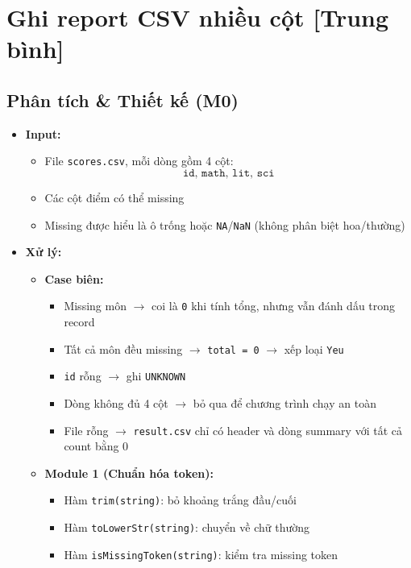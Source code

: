 \section{Ghi report CSV nhiều cột [Trung bình]}

\subsection{Phân tích \& Thiết kế (M0)}
\begin{itemize}
    \item \textbf{Input:}
    \begin{itemize}
        \item File \texttt{scores.csv}, mỗi dòng gồm 4 cột:
        \[
            \texttt{id, math, lit, sci}
        \]
        \item Các cột điểm có thể missing
        \item Missing được hiểu là ô trống hoặc \texttt{NA}/\texttt{NaN} (không phân biệt hoa/thường)
    \end{itemize}

    \item \textbf{Xử lý:}
    \begin{itemize}
        \item \textbf{Case biên:}
        \begin{itemize}
            \item Missing môn $\rightarrow$ coi là \texttt{0} khi tính tổng, nhưng vẫn đánh dấu trong record
            \item Tất cả môn đều missing $\rightarrow$ \texttt{total = 0} $\rightarrow$ xếp loại \texttt{Yeu}
            \item \texttt{id} rỗng $\rightarrow$ ghi \texttt{UNKNOWN}
            \item Dòng không đủ 4 cột $\rightarrow$ bỏ qua để chương trình chạy an toàn
            \item File rỗng $\rightarrow$ \texttt{result.csv} chỉ có header và dòng summary với tất cả count bằng 0
        \end{itemize}

        \item \textbf{Module 1 (Chuẩn hóa token):}
        \begin{itemize}
            \item Hàm \texttt{trim(string)}: bỏ khoảng trắng đầu/cuối
            \item Hàm \texttt{toLowerStr(string)}: chuyển về chữ thường
            \item Hàm \texttt{isMissingToken(string)}: kiểm tra missing token
        \end{itemize}


\end{itemize}
\end{itemize}
